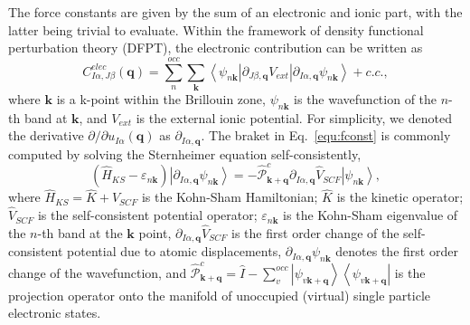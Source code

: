 \documentclass[journal=jctcce,manuscript=article]{achemso}
\begin{document}
The force constants are given by the sum of an  electronic and ionic part, with the latter being trivial to evaluate. Within the framework of density functional perturbation theory (DFPT), the electronic contribution can be written as
\begin{equation}
    C^{elec}_{I\alpha,J\beta}(\mathbf{q}) = \sum_{n}^{occ}\sum_\mathbf{k}\left\langle
    \psi_{n\mathbf{k}}
    \left|
    \partial_{J\beta,\mathbf{q}}V_{ext}
    \right|
    \partial_{I\alpha,\mathbf{q}}\psi_{n\mathbf{k}}
    \right\rangle  +c.c. ,\label{equ:fconst}
\end{equation}
where $\mathbf{k}$ is a k-point within the Brillouin zone, $\psi_{n\mathbf{k}}$ is the wavefunction of the $n$-th band at $\mathbf{k}$, and $V_{ext}$ is the external ionic potential. For simplicity, we denoted the derivative $\partial/\partial u_{I\alpha}(\mathbf{q})$ as $\partial_{I\alpha,\mathbf{q}}$. The braket in Eq.~\ref{equ:fconst} is commonly computed by solving the Sternheimer equation self-consistently,
\begin{equation}
    (\hat{H}_{KS}-\varepsilon_{n\mathbf{k}})\left|\partial_{I\alpha,\mathbf{q}}\psi_{n\mathbf{k}}\right\rangle = -\hat{\mathcal{P}}^c_{\mathbf{k}+\mathbf{q}}\partial_{I\alpha,\mathbf{q}} \hat{V}_{SCF}\left|\psi_{n\mathbf{k}}\right\rangle,
\end{equation}
where $\hat{H}_{KS} = \hat{K} + \hat{V}_{SCF}$ is the Kohn-Sham Hamiltonian; $\hat{K}$ is the kinetic operator; $\hat{V}_{SCF}$ is the self-consistent potential operator; $\varepsilon_{n\mathbf{k}}$ is the Kohn-Sham eigenvalue of the $n$-th band at the $\mathbf{k}$ point, $\partial_{I\alpha,\mathbf{q}} \hat{V}_{SCF}$ is the first order change of the self-consistent potential due to atomic displacements,  $\partial_{I\alpha,\mathbf{q}} \psi_{n\mathbf{k}}$ denotes the first order change of the wavefunction, and $\hat{\mathcal{P}}^c_{\mathbf{k}+\mathbf{q}} = \hat{I}-\sum_{v}^{occ}\left|\psi_{v\mathbf{k}+\mathbf{q}}\right\rangle\left\langle\psi_{v\mathbf{k}+\mathbf{q}}\right|$ is the projection operator onto the  manifold of unoccupied (virtual) single particle electronic states.
\end{document}
